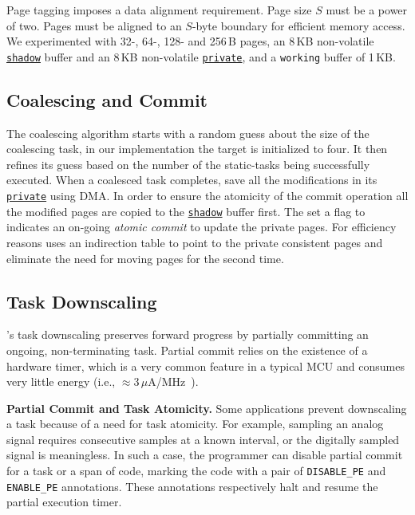 Page tagging imposes a data alignment requirement.
Page size $S$ must be a power of two. 
%
Pages must be aligned to an $S$-byte boundary for efficient memory access. 
%
We experimented with 32-, 64-, 128- and 256\,B pages, an 8\,KB non-volatile \texttt{\underline{shadow}} buffer and
an 8\,KB non-volatile \texttt{\underline{private}}, and a \texttt{working} buffer
of 1\,KB.
%
\subsection{Coalescing and Commit}
%
The coalescing algorithm starts with a random guess about the size of the coalescing task, in our implementation the target is initialized to four. It then refines its guess based on the number of the static-tasks being successfully executed.
%
When a coalesced task completes, \sys save all the modifications in its \texttt{\underline{private}} using DMA. In order to ensure the atomicity of the commit operation all the modified pages are copied to the \texttt{\underline{shadow}} buffer first. The \sys set a flag to indicates an on-going \emph{atomic commit} to update the private pages. For efficiency reasons \sys uses an indirection table to point to the private consistent pages and eliminate the need for moving pages for the second time.
%
\subsection{Task Downscaling}
%
\sys's task downscaling preserves forward progress by partially committing an
ongoing, non-terminating task. 
%
Partial commit relies on the existence of a hardware timer, which is a very
common feature in a typical MCU and consumes very little energy (i.e.,
$\approx$3\,$\mu$A/MHz~\cite{msp430datasheet}).  

 \textbf{Partial Commit and Task Atomicity.} Some applications prevent
downscaling a task because of a need for task atomicity.  For example, sampling
an analog signal requires consecutive samples at a known interval, or the
digitally sampled signal is meaningless.  In such a case, the programmer can
disable partial commit for a task or a span of code, marking  the code with a
pair of \texttt{DISABLE\_PE} and \texttt{ENABLE\_PE} annotations.
These annotations respectively halt and resume the partial execution timer.